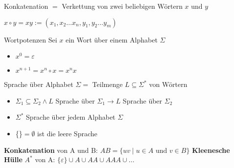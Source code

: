 \begin{definition}{Konkatenation}
    $=$ Verkettung von zwei beliebigen Wörtern $x$ und $y$

    $
    x \circ y=x y:=\left(x_{1}, x_{2} \ldots x_{n}, y_{1}, y_{2} \ldots y_{m}\right)
    $
\end{definition}

\begin{definition}{Wortpotenzen} Sei $x$ ein Wort über einem Alphabet $\Sigma$\\
    \begin{minipage}{0.2\linewidth}
        \begin{itemize}
            \item $x^{0}=\varepsilon$
        \end{itemize}
    \end{minipage}
    \begin{minipage}{0.5\linewidth}
        \begin{itemize}
            \item $x^{n+1}=x^{n} \circ x=x^{n} x$
        \end{itemize}
    \end{minipage}
\end{definition}

\begin{definition}{Sprache}
    über Alphabet $\Sigma=$ Teilmenge $L \subseteq \Sigma^{*}$ von Wörtern
    \begin{itemize}
    \item $\Sigma_{1} \subseteq \Sigma_{2} \wedge L$ Sprache über $\Sigma_{1} \rightarrow L$ Sprache über $\Sigma_{2}$
    \item $\Sigma^{*}$ Sprache über jedem Alphabet $\Sigma$
    \item \{\}$=\emptyset$ ist die leere Sprache
    \end{itemize}

    \textbf{Konkatenation} von A und B: $A B=\{u v \mid u \in A \text { und } v \in B\}$
    \textbf{Kleenesche Hülle} $A^{*}$ von A: $\{\varepsilon\} \cup A \cup A A \cup A A A \cup \ldots$
\end{definition}